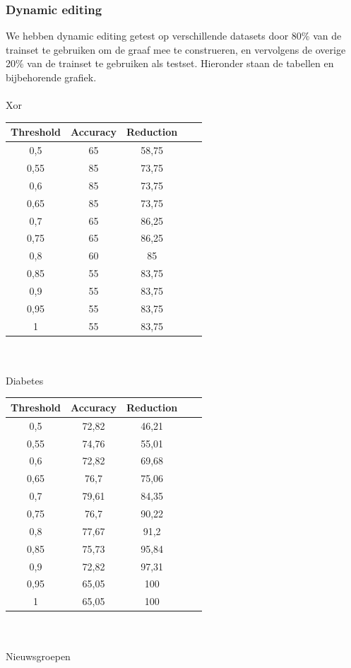 \documentclass{article}
\begin{document}
\subsubsection{Dynamic editing}
We hebben dynamic editing getest op verschillende datasets door 80\% van de trainset te gebruiken om de graaf mee te construeren, en vervolgens de overige 20\% van de trainset te gebruiken als testset. Hieronder staan de tabellen en bijbehorende grafiek.\\
\\
Xor\\
\begin{tabular}{|c|c|c|c|c|}  \hline			
Threshold	& Accuracy &	Reduction \\ \hline
0,5 &	65 &	58,75 \\
0,55 &	85 &	73,75 \\
0,6 &	85 &	73,75 \\
0,65 &	85 &	73,75 \\
0,7 &	65 &	86,25 \\
0,75 &	65 &	86,25 \\
0,8 &	60 &	85 \\
0,85 &	55 &	83,75 \\
0,9 &	55 &	83,75 \\
0,95 &	55 &	83,75 \\
1 &	55 &	83,75 \\ \hline
\end{tabular} \\
\\
Diabetes\\
\begin{tabular}{|c|c|c|c|c|}  \hline			
Threshold	& Accuracy &	Reduction \\ \hline
0,5 &	72,82 &	46,21 \\
0,55 &	74,76 &	55,01 \\
0,6 &	72,82 &	69,68 \\
0,65 &	76,7 &	75,06 \\
0,7 &	79,61 &	84,35 \\
0,75 &	76,7 &	90,22 \\
0,8 &	77,67 &	91,2 \\
0,85 &	75,73 &	95,84 \\
0,9 &	72,82 &	97,31 \\
0,95 &	65,05 &	100 \\
1 &	65,05 &	100 \\ \hline
\end{tabular} \\
\\
Nieuwsgroepen\\
\end{document}
